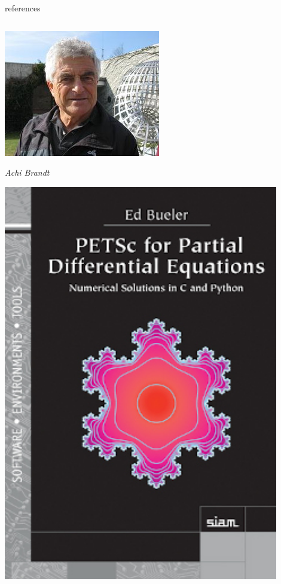 \documentclass[10pt,
               svgnames,
               hyperref={colorlinks,citecolor=DeepPink4,linkcolor=FireBrick,urlcolor=Maroon},
               usepdftitle=false]{beamer}
\begin{document}
\begin{frame}{references}
\begin{columns}
\begin{column}{0.17\textwidth}
\hfill \includegraphics[width=\textwidth]{images/abrandt.jpg}

\hfill {\scriptsize \emph{Achi Brandt}}

\vspace{10mm}
\hfill \includegraphics[width=0.9\textwidth]{images/bueler.jpg}

\vspace{20mm}
\end{column}
\end{columns}
\end{frame}
\end{document}
